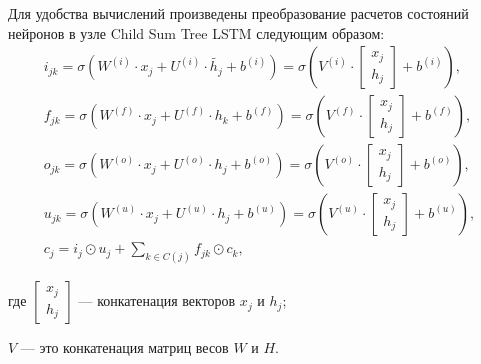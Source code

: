 Для удобства вычислений произведены преобразование расчетов состояний нейронов в узле Child Sum Tree LSTM следующим образом:
\begin{gather}
  \label{eq:func:lstm:i}
  i_{jk} = \sigma(W^{(i)}\cdot{x_j} + U^{(i)}\cdot{\tilde{h_j}} + b^{(i)}) = \sigma({V^{(i)}\cdot{
      \begin{bmatrix}
        x_j\\
        h_j
      \end{bmatrix}} + b^{(i)}}),\\
  \label{eq:func:lstm:forget}
  f_{jk} = \sigma(W^{(f)}\cdot{x_j} + U^{(f)}\cdot{h_k} + b^{(f)}) = \sigma({V^{(f)}\cdot{
      \begin{bmatrix}
        x_j\\
        h_j
      \end{bmatrix}} + b^{(f)}}),\\
  \label{eq:func:lstm:o}
  o_{jk} = \sigma(W^{(o)}\cdot{x_j} + U^{(o)}\cdot{h_j} + b^{(o)}) = \sigma({V^{(o)}\cdot{
      \begin{bmatrix}
        x_j\\
        h_j
      \end{bmatrix}} + b^{(o)}}),\\
  \label{eq:func:lstm:u}
  u_{jk} = \sigma(W^{(u)}\cdot{x_j} + U^{(u)}\cdot{h_j} + b^{(u)}) = \sigma({V^{(u)}\cdot{
      \begin{bmatrix}
        x_j\\
        h_j
      \end{bmatrix}} + b^{(u)}}),\\
  \label{eq:func:lstm:transform}
  c_j = i_j\odot{u_j} + \sum_{k\in{C(j)}}f_{jk}\odot{c_k},
\end{gather}
\begin{explanationx}
\item [где]       $\begin{bmatrix}x_j\\h_j\end{bmatrix}$ --- конкатенация векторов $x_j$ и $h_j$;
\item $V$ --- это конкатенация матриц весов $W$ и $H$.
\end{explanationx}

